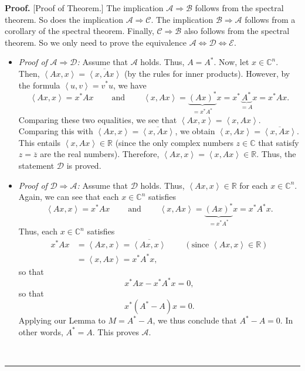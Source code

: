 \documentclass[numbers=enddot,12pt,final,onecolumn,notitlepage]{scrartcl}%
\numberwithin{exer}{subsection}
\theoremstyle{definition}
\newenvironment{proof}[1][Proof]{\noindent\textbf{#1.} }{\ \rule{0.5em}{0.5em}}
\begin{document}
\begin{proof}
[Proof of Theorem.] The implication $\mathcal{A}\Longrightarrow\mathcal{B}$
follows from the spectral theorem. So does the implication $\mathcal{A}%
\Longrightarrow\mathcal{C}$. The implication $\mathcal{B}\Longrightarrow
\mathcal{A}$ follows from a corollary of the spectral theorem. Finally,
$\mathcal{C}\Longrightarrow\mathcal{B}$ also follows from the spectral
theorem. So we only need to prove the equivalence $\mathcal{A}%
\Longleftrightarrow\mathcal{D}\Longleftrightarrow\mathcal{E}$.

\begin{itemize}
\item \textit{Proof of }$\mathcal{A}\Longrightarrow\mathcal{D}$\textit{:}
Assume that $\mathcal{A}$ holds. Thus, $A=A^{\ast}$. Now, let $x\in
\mathbb{C}^{n}$. Then, $\left\langle Ax,x\right\rangle =\overline{\left\langle
x,Ax\right\rangle }$ (by the rules for inner products). However, by the
formula $\left\langle u,v\right\rangle =v^{\ast}u$, we have%
\[
\left\langle Ax,x\right\rangle =x^{\ast}Ax\ \ \ \ \ \ \ \ \ \ \text{and}%
\ \ \ \ \ \ \ \ \ \ \left\langle x,Ax\right\rangle =\underbrace{\left(
Ax\right)  ^{\ast}}_{=x^{\ast}A^{\ast}}x=x^{\ast}\underbrace{A^{\ast}}%
_{=A}x=x^{\ast}Ax.
\]
Comparing these two equalities, we see that $\left\langle Ax,x\right\rangle
=\left\langle x,Ax\right\rangle $. Comparing this with $\left\langle
Ax,x\right\rangle =\overline{\left\langle x,Ax\right\rangle }$, we obtain
$\left\langle x,Ax\right\rangle =\overline{\left\langle x,Ax\right\rangle }$.
This entails $\left\langle x,Ax\right\rangle \in\mathbb{R}$ (since the only
complex numbers $z\in\mathbb{C}$ that satisfy $z=\overline{z}$ are the real
numbers). Therefore, $\left\langle Ax,x\right\rangle =\left\langle
x,Ax\right\rangle \in\mathbb{R}$. Thus, the statement $\mathcal{D}$ is proved.

\item \textit{Proof of }$\mathcal{D}\Longrightarrow\mathcal{A}$\textit{:}
Assume that $\mathcal{D}$ holds. Thus, $\left\langle Ax,x\right\rangle
\in\mathbb{R}$ for each $x\in\mathbb{C}^{n}$. Again, we can see that each
$x\in\mathbb{C}^{n}$ satisfies%
\[
\left\langle Ax,x\right\rangle =x^{\ast}Ax\ \ \ \ \ \ \ \ \ \ \text{and}%
\ \ \ \ \ \ \ \ \ \ \left\langle x,Ax\right\rangle =\underbrace{\left(
Ax\right)  ^{\ast}}_{=x^{\ast}A^{\ast}}x=x^{\ast}A^{\ast}x.
\]
Thus, each $x\in\mathbb{C}^{n}$ satisfies%
\begin{align*}
x^{\ast}Ax  & =\left\langle Ax,x\right\rangle =\overline{\left\langle
Ax,x\right\rangle }\ \ \ \ \ \ \ \ \ \ \left(  \text{since }\left\langle
Ax,x\right\rangle \in\mathbb{R}\right)  \\
& =\left\langle x,Ax\right\rangle =x^{\ast}A^{\ast}x,
\end{align*}
so that
\[
x^{\ast}Ax-x^{\ast}A^{\ast}x=0,
\]
so that%
\[
x^{\ast}\left(  A^{\ast}-A\right)  x=0.
\]
Applying our Lemma to $M=A^{\ast}-A$, we thus conclude that $A^{\ast}-A=0$. In
other words, $A^{\ast}=A$. This proves $\mathcal{A}$.


\end{itemize}
\end{proof}
\end{document}

